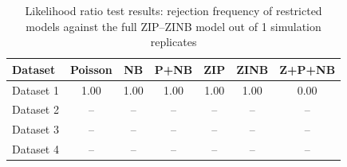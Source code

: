 \begin{table}[!h]
\caption{Likelihood ratio test results: rejection frequency of restricted models against the full ZIP--ZINB model out of 1 simulation replicates}
\centering
\begin{tabular}{lcccccc}
\toprule
Dataset & Poisson & NB & P+NB & ZIP & ZINB & Z+P+NB \\
\midrule
Dataset 1 & 1.00 & 1.00 & 1.00 & 1.00 & 1.00 & 0.00 \\
Dataset 2 & -- & -- & -- & -- & -- & -- \\
Dataset 3 & -- & -- & -- & -- & -- & -- \\
Dataset 4 & -- & -- & -- & -- & -- & -- \\
\bottomrule
\end{tabular}
\label{tab:sim_lrt}
\end{table}
